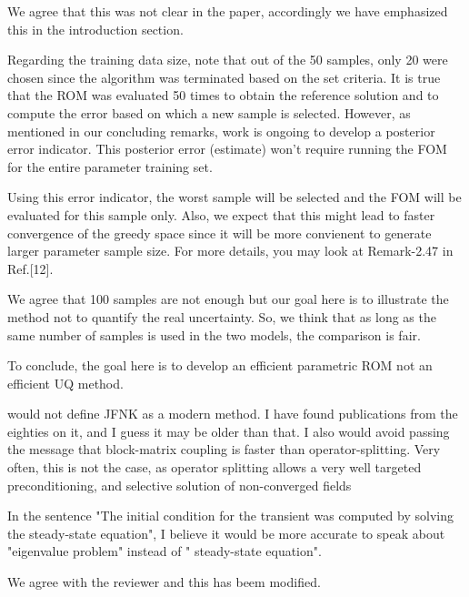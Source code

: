 \documentclass[10pt]{article}
\begin{document}
\begin{response}
\begin{itemize}
{  We agree that this was not clear in the paper, accordingly we have emphasized this in the introduction section.}
  
  \item{Regarding the training data size, note that out of the 50 samples, only 20 were chosen since the algorithm was terminated based on the set criteria.
  It is true that the ROM was evaluated 50 times to obtain the reference solution and to compute the error based on which a new sample is selected.  
  However, as mentioned in our concluding remarks, work is ongoing to develop a posterior error indicator. This posterior error (estimate) won’t require running the FOM for the entire parameter training set.
  	 
  Using this error indicator, the worst sample will be selected and the FOM will be evaluated for this sample only. 
  Also, we expect that this might lead to faster convergence of the greedy space since it will be more convienent to generate larger parameter sample size.
  For more details, you may look at Remark-2.47 in Ref.[12].}
  \item{We agree that 100 samples are not enough but our goal here is to illustrate the method not to quantify the real uncertainty. So, we think that as long as the same number of samples is used in the two models, the comparison is fair.
  \item To conclude, the goal here is to develop an efficient parametric ROM not an efficient UQ method.}
  \end{itemize}

\end{response}

\begin{response}{ would not define JFNK as a modern method. I have found publications from the eighties on it, and I guess it may be older than that. I also would avoid passing the message that block-matrix coupling is faster than operator-splitting. Very often, this is not the case, as operator splitting allows a very well targeted preconditioning, and selective solution of non-converged fields
   }

  

\end{response}

\begin{response}{
 In the sentence "The initial condition for the transient was computed by solving the steady-state equation", I believe it would be more accurate to speak about "eigenvalue problem" instead of " steady-state equation".}

We agree with the reviewer and this has beem modified.

\end{response}
\end{document}

